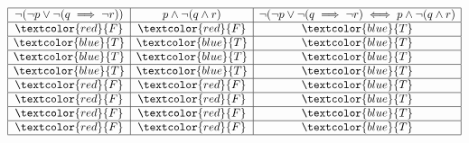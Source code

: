 \documentclass[12pt, letterpaper]{article}
\begin{document}
\begin{displaymath}
    \begin{array}{|c|c|c|}
    \hline
    \neg(\neg p \lor \neg(q \implies \neg r)) & p \land \neg(q \land r) & \neg(\neg p \lor \neg(q \implies \neg r) \iff p \land \neg(q \land r) \\ %
    \hline %
    \textcolor{red}{F} & \textcolor{red}{F} & \textcolor{blue}{T}\\
    \hline
    \textcolor{blue}{T} & \textcolor{blue}{T} & \textcolor{blue}{T}\\
    \hline
    \textcolor{blue}{T} & \textcolor{blue}{T} & \textcolor{blue}{T}\\
    \hline
    \textcolor{blue}{T} & \textcolor{blue}{T} & \textcolor{blue}{T}\\
    \hline
    \textcolor{red}{F} & \textcolor{red}{F} & \textcolor{blue}{T}\\
    \hline
    \textcolor{red}{F} & \textcolor{red}{F} & \textcolor{blue}{T}\\
    \hline
    \textcolor{red}{F} & \textcolor{red}{F} & \textcolor{blue}{T}\\
    \hline
    \textcolor{red}{F} & \textcolor{red}{F} & \textcolor{blue}{T}\\
    \hline
    \end{array}
\end{displaymath} \\
\end{document}
